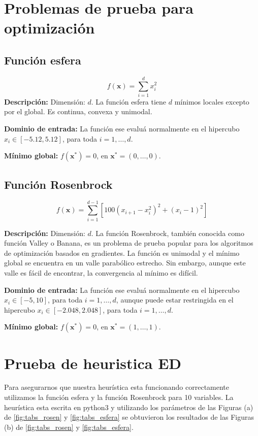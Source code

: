 \documentclass[10pt,a4paper]{article}
\begin{document}
\section{Problemas de prueba para optimización}
	\subsection{Función esfera}
	\begin{equation}
		f(\mathbf{x}) = \sum_{i=1} ^{d} x_{i}^{2}
	\end{equation}
	\textbf{Descripción:} Dimensión: $d$. La función esfera tiene $d$ mínimos locales excepto por el global. Es continua, convexa y unimodal.
	
	\textbf{Dominio de entrada:} La función ese evaluá normalmente en el hipercubo  $x_{i} \in [-5.12, 5.12]$, para toda $i = 1, \ldots, d$.
	
	\textbf{Mínimo global:} $f(\mathbf{x^{*}}) = 0$, en $\mathbf{x^{*}} = (0, \ldots , 0)$.
	
	
	\subsection{Función Rosenbrock}
	\begin{equation}
		f(\mathbf{x}) = \sum_{i=1} ^{d-1} \left[  100(x_{i+1} - x_{i}^{2})^{2} + (x_{i} -1)^{2}  \right]
	\end{equation}
	
	\textbf{Descripción:} 
	Dimensión: $d$.	La función Rosenbrock, también conocida como función Valley o Banana, es un problema de prueba popular para los algoritmos de optimización basados en gradientes. La función es unimodal y el mínimo global se encuentra en un valle parabólico estrecho. Sin embargo, aunque este valle es fácil de encontrar, la convergencia al mínimo es difícil.
	
	\textbf{Dominio de entrada:} La función ese evaluá normalmente en el hipercubo  $x_{i} \in [-5, 10]$, para toda $i = 1, \ldots, d$, aunque puede estar restringida en el hipercubo  $x_{i} \in [-2.048, 2.048]$, para toda $i = 1, \ldots, d$.
	
	\textbf{Mínimo global:} $f(\mathbf{x^{*}}) = 0$, en $\mathbf{x^{*}} = (1, \ldots , 1)$.


\section{Prueba de heuristica ED}

Para asegurarnos que nuestra heurística esta funcionando correctamente utilizamos la función esfera y la función Rosenbrock para 10 variables. La heurística esta escrita en python3 y utilizando los parámetros de las Figuras (a) de \ref{fig:tabs_rosen} y \ref{fig:tabs_esfera} se obtuvieron los resultados de las Figuras (b) de \ref{fig:tabs_rosen} y \ref{fig:tabs_esfera}.
\end{document}
